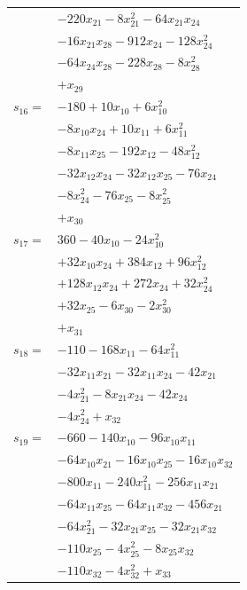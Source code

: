 \begin{longtable}{@{}r@{\;}l@{}}
 & \(\displaystyle -220x_{21} -8x_{21}^{2} -64x_{21}x_{24}\) \\
 & \(\displaystyle -16x_{21}x_{28} -912x_{24} -128x_{24}^{2}\) \\
 & \(\displaystyle -64x_{24}x_{28} -228x_{28} -8x_{28}^{2}\) \\
 & \(\displaystyle +x_{29}\) \\[3pt]
\(s_{16}=\) & \(\displaystyle -180 +10x_{10} +6x_{10}^{2}\) \\
 & \(\displaystyle -8x_{10}x_{24} +10x_{11} +6x_{11}^{2}\) \\
 & \(\displaystyle -8x_{11}x_{25} -192x_{12} -48x_{12}^{2}\) \\
 & \(\displaystyle -32x_{12}x_{24} -32x_{12}x_{25} -76x_{24}\) \\
 & \(\displaystyle -8x_{24}^{2} -76x_{25} -8x_{25}^{2}\) \\
 & \(\displaystyle +x_{30}\) \\[3pt]
\(s_{17}=\) & \(\displaystyle 360 -40x_{10} -24x_{10}^{2}\) \\
 & \(\displaystyle +32x_{10}x_{24} +384x_{12} +96x_{12}^{2}\) \\
 & \(\displaystyle +128x_{12}x_{24} +272x_{24} +32x_{24}^{2}\) \\
 & \(\displaystyle +32x_{25} -6x_{30} -2x_{30}^{2}\) \\
 & \(\displaystyle +x_{31}\) \\[3pt]
\(s_{18}=\) & \(\displaystyle -110 -168x_{11} -64x_{11}^{2}\) \\
 & \(\displaystyle -32x_{11}x_{21} -32x_{11}x_{24} -42x_{21}\) \\
 & \(\displaystyle -4x_{21}^{2} -8x_{21}x_{24} -42x_{24}\) \\
 & \(\displaystyle -4x_{24}^{2} +x_{32}\) \\[3pt]
\(s_{19}=\) & \(\displaystyle -660 -140x_{10} -96x_{10}x_{11}\) \\
 & \(\displaystyle -64x_{10}x_{21} -16x_{10}x_{25} -16x_{10}x_{32}\) \\
 & \(\displaystyle -800x_{11} -240x_{11}^{2} -256x_{11}x_{21}\) \\
 & \(\displaystyle -64x_{11}x_{25} -64x_{11}x_{32} -456x_{21}\) \\
 & \(\displaystyle -64x_{21}^{2} -32x_{21}x_{25} -32x_{21}x_{32}\) \\
 & \(\displaystyle -110x_{25} -4x_{25}^{2} -8x_{25}x_{32}\) \\
 & \(\displaystyle -110x_{32} -4x_{32}^{2} +x_{33}\) \\[3pt]

\end{longtable}
